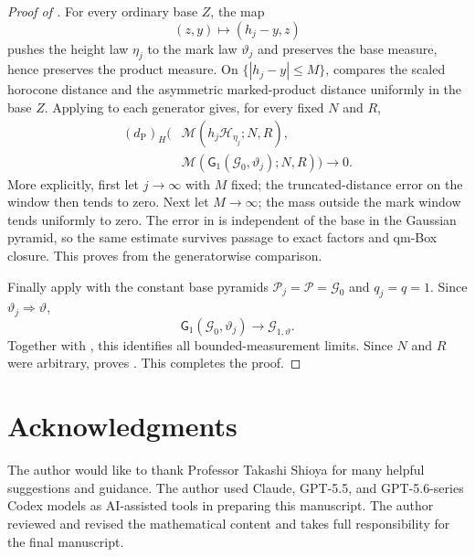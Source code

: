 \documentclass{amsart}
\numberwithin{equation}{section}
\theoremstyle{plain}
\theoremstyle{definition}
\theoremstyle{remark}
\begin{document}
\begin{proof}[Proof of ]
For every ordinary base $Z$, the map
\[
 (z,y)\longmapsto(h_j-y,z)
\]
pushes the height law $\eta_j$ to the mark law $\vartheta_j$ and preserves the base measure, hence preserves the product
measure.  On $\{|h_j-y|\le M\}$,  compares the scaled horocone distance and the
asymmetric marked-product distance uniformly in the base $Z$.  Applying  to each
generator gives, for every fixed $N$ and $R$,
\begin{equation}\label{eq:tangent-measurement-comparison}
\begin{split}
 (d_{\mathrm P})_H\bigl(&
  \mathcal M(h_j\mathcal H_{\eta_j};N,R),\\
 &\mathcal M(\mathsf G_1(\mathcal G_0,\vartheta_j);N,R)
 \bigr)\longrightarrow0.
\end{split}
\end{equation}
More explicitly, first let $j\to\infty$ with $M$ fixed; the truncated-distance error on the window then tends to zero.
Next let $M\to\infty$; the mass outside the mark window tends uniformly to zero.  The error in
 is independent of the base in the Gaussian pyramid, so the same estimate survives
passage to exact factors and qm-Box closure.  This proves  from the generatorwise
comparison.

Finally apply  with the constant base pyramids
$\mathcal P_j=\mathcal P=\mathcal G_0$ and $q_j=q=1$.  Since $\vartheta_j\Rightarrow\vartheta$,
\[
 \mathsf G_1(\mathcal G_0,\vartheta_j)
 \longrightarrow\mathcal G_{1,\vartheta}.
\]
Together with , this identifies all bounded-measurement limits.  Since $N$ and $R$
were arbitrary,  proves
.  This completes the proof.
\end{proof}

\clearpage

\section*{Acknowledgments}

The author would like to thank Professor Takashi Shioya for many helpful suggestions and guidance. The author used Claude, GPT-5.5, and GPT-5.6-series Codex models as AI-assisted tools in preparing this manuscript.  The author reviewed and revised the mathematical content and takes full responsibility for the final manuscript.
\end{document}
